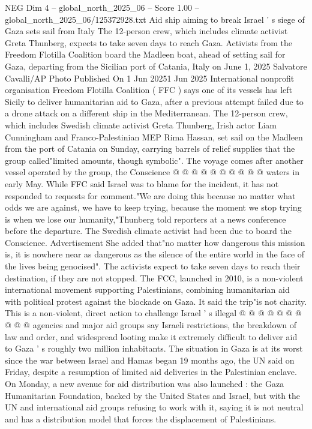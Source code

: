 \begin{textsample}{NEG Dim 4 – global\_north\_2025\_06 – Score 1.00 – global\_north\_2025\_06/125372928.txt}  \label{ex:f4_neg_069}
Aid ship aiming to break Israel ' s siege of Gaza sets sail from Italy The 12-person crew, which includes climate activist Greta Thunberg, expects to take seven days to reach Gaza.
Activists from the Freedom Flotilla Coalition board the Madleen boat, ahead of setting sail for Gaza, departing from the Sicilian port of Catania, Italy on June 1, 2025 Salvatore Cavalli/AP Photo Published On 1 Jun 20251 Jun 2025 International nonprofit organisation Freedom Flotilla Coalition ( FFC ) says one of its vessels has left Sicily to deliver humanitarian aid to Gaza, after a previous attempt failed due to a drone attack on a different ship in the Mediterranean.
The 12-person crew, which includes Swedish climate activist Greta Thunberg, Irish actor Liam Cunningham and Franco-Palestinian MEP Rima Hassan, set sail on the Madleen from the port of Catania on Sunday, carrying barrels of relief supplies that the group called"limited amounts, though symbolic".
The voyage comes after another vessel operated by the group, the Conscience @ @ @ @ @ @ @ @ @ @ waters in early May.
While FFC said Israel was to blame for the incident, it has not responded to requests for comment."We are doing this because no matter what odds we are against, we have to keep trying, because the moment we stop trying is when we lose our humanity,"Thunberg told reporters at a news conference before the departure.
The Swedish climate activist had been due to board the Conscience.
Advertisement She added that"no matter how dangerous this mission is, it is nowhere near as dangerous as the silence of the entire world in the face of the lives being genocised".
The activists expect to take seven days to reach their destination, if they are not stopped.
The FCC, launched in 2010, is a non-violent international movement supporting Palestinians, combining humanitarian aid with political protest against the blockade on Gaza.
It said the trip"is not charity.
This is a non-violent, direct action to challenge Israel ' s illegal @ @ @ @ @ @ @ @ @ @ agencies and major aid groups say Israeli restrictions, the breakdown of law and order, and widespread looting make it extremely difficult to deliver aid to Gaza ' s roughly two million inhabitants.
The situation in Gaza is at its worst since the war between Israel and Hamas began 19 months ago, the UN said on Friday, despite a resumption of limited aid deliveries in the Palestinian enclave.
On Monday, a new avenue for aid distribution was also launched : the Gaza Humanitarian Foundation, backed by the United States and Israel, but with the UN and international aid groups refusing to work with it, saying it is not neutral and has a distribution model that forces the displacement of Palestinians.

\end{textsample}
